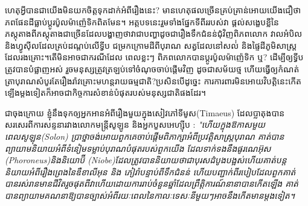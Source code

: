 \documentclass[10pt,twocolumn,letterpaper]{article}
\begin{document}
ហេតុអ្វីបានជា​យើងមិនយកចិត្តទុកដាក់អំពីរឿងនេះ? មានហេតុផលច្រើនគ្រប់គ្រាន់អោយយើងជឿថាភពផែនដីធ្លាប់ប្តូរប៉ូលម៉ាញ៉េទិកពិតមែន។ អត្តបទនេះរួមទាំងផ្នែកទីពីររបស់វា ផ្ដល់សង្ខេបខ្លីនៃភស្តុតាងពីភស្តុតាងជាច្រើនដែលបង្ហាញថាវាជាបញ្ហា​ដូចជារឿងទឹកជំនន់ជុំវិញពិភពលោក វាលអំបិលនិងហ្វូស៊ីលដែលគ្រប់ដណ្តប់លើទ្វីប ជម្រកក្រោមដីពីបុរាណ សត្វដែលនៅសល់់ និងផ្ទៃដីភូមិសាស្ត្រដែលរងគ្រោះ។តើមិនអាចជាករណីដែល ពេលខ្លះៗ ពិភពលោកបានប្តូរប៉ូលម៉ាញ៉េទិក ឬ? ដើម្បីឲ្យទ្វីបត្រូវបានបំផ្លាញអស់ រួចមនុស្សត្រូវត្រឡប់ទៅចំណុចចាប់ផ្ដើមវិញ ដូចជាសម័យថ្ម ហើយធ្វើឲ្យកំណត់ត្រាបុរាណសំបូរតែរឿងរ៉ាវគ្រោះមហន្តរាយធម្មជាតិ?ប្រសិនបើដូច្នេះ ការការពារមិនអោយវិបត្តិនេះកើតឡើងម្ដងទៀតក៏អាចជាកិច្ចការសំខាន់បំផុតរបស់មនុស្សជាតិផងដែរ។

ជាចុងក្រោយ ខ្ញុំនឹងទុកឲ្យអ្នកអានអំពីរឿងមួយក្នុងសៀវភៅទីមូស(Timaeus) ដែលប្លាតុងបានសរសេរពីការសន្ទនារវាងលោកមន្រ្តីសូឡូន  និងអ្នកបួសអេហ្ស៊ីប \cite{140}: \textit{"ហើយក្នុងឱកាសមួយ ពេលសូឡុន(Solon) ប្រាថ្នាចង់អោយពួកគេចាប់ផ្តើមពិភាក្សាអំពីប្រវត្តិសាស្រ្តបុរាណ គាត់បានព្យាយាមនិយាយអំពីទំនៀមទម្លាប់បុរាណបំផុតរបស់ពួកយើង ដែលទាក់ទងនឹងផូរណេអ៊ុស (Phoroneus)និងនិយោប៊ី (Niobe)ដែលត្រូវបាននិយាយថាជាបុរសដំបូងបង្អស់ ​ហើយគាត់បន្តនិយាយអំពីរឿងព្រេងនៃឌឺខាលីអុន និង ភៀរ៉ាបន្ទាប់ពីទឹកជំនន់ ហើយបញ្ជាក់ពីរបៀបដែលពួកគាត់បានរស់រានមានជីវិតរួចផុតពីវាហើយ​ដោយការរាប់ចំនួនឆ្នាំដែលព្រឹត្តិការណ៍នានាបានកើតឡើង គាត់បានព្យាយាមគណនាឱ្យបានច្បាស់អំពីរយៈពេលនៃកាលៈទេសៈនីមួយៗអាចនឹងកើតមានម្តងទៀត។
}
\end{document}
